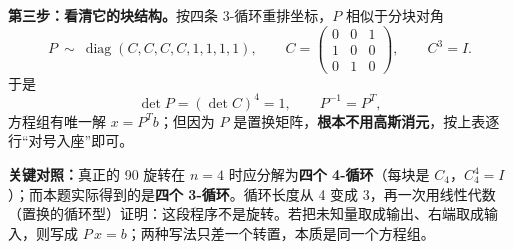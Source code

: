 \documentclass[11pt,a4paper,UTF8]{ctexart}
\begin{document}
\textbf{第三步：看清它的块结构。}按四条 3-循环重排坐标，$P$ 相似于分块对角
\[
P\ \sim\ \operatorname{diag}(C,C,C,C,1,1,1,1),\qquad
C=\begin{pmatrix}0&0&1\\[1pt]1&0&0\\[1pt]0&1&0\end{pmatrix},\qquad C^{3}=I .
\]
于是
\[
\det P=(\det C)^{4}=1,\qquad P^{-1}=P^{T},
\]
方程组有唯一解 $x=P^{T}b$；但因为 $P$ 是置换矩阵，\textbf{根本不用高斯消元}，按上表逐行“对号入座”即可。

\begin{warnbox}
\textbf{关键对照：}真正的 90\textdegree{} 旋转在 $n=4$ 时应分解为\textbf{四个 4-循环}（每块是 $C_4$，$C_4^{4}=I$）；而本题实际得到的是\textbf{四个 3-循环}。循环长度从 4 变成 3，再一次用线性代数（置换的循环型）证明：这段程序不是旋转。若把未知量取成输出、右端取成输入，则写成 $P\,x=b$；两种写法只差一个转置，本质是同一个方程组。
\end{warnbox}
\end{document}
